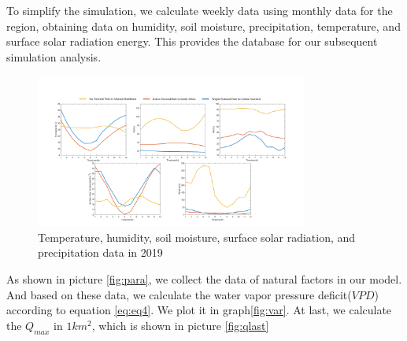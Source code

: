\documentclass[12pt]{article}  %
\begin{document}
To simplify the simulation, we calculate weekly data using monthly data for the region, obtaining data on humidity, soil moisture, precipitation, temperature, and surface solar radiation energy. This provides the database for our subsequent simulation analysis.
\newpage

\vspace{-0.3cm}
\begin{figure}[htbp]
	\centering
	\includegraphics[width=0.8\textwidth]{easymcm/img/parameter.pdf}
	\caption{Temperature, humidity, soil moisture,
            surface solar radiation, and precipitation data in 2019}
 \label{fig:para}
\end{figure}

As shown in picture \eqref{fig:para}, we collect the data of natural factors in our model. And based on these data, we calculate the water vapor pressure deficit($VPD$) according to equation \eqref{eq:eq4}. We plot it in graph\eqref{fig:var}. At last, we calculate the $Q_{max}$ in $1 km^2$, which is shown in picture \eqref{fig:qlast}
\end{document}
